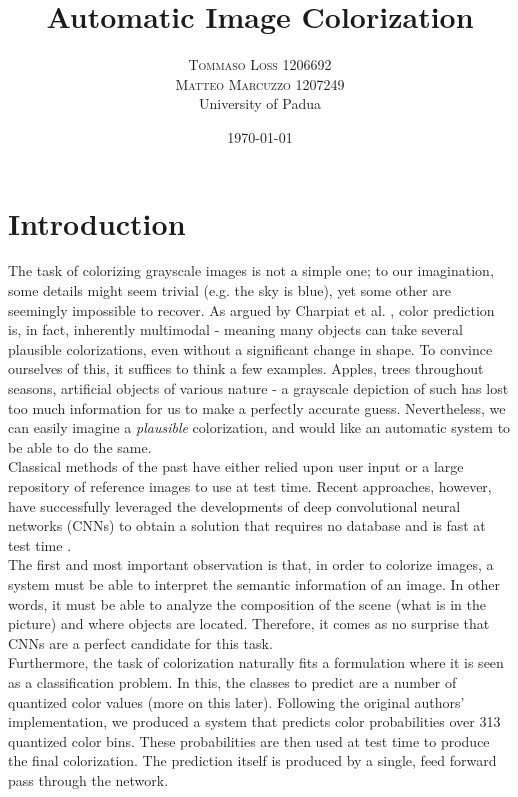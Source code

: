 \documentclass[twoside,twocolumn]{article}
\title{Automatic Image Colorization} %
\author{%
\textsc{Tommaso Loss 1206692} \\
\textsc{Matteo Marcuzzo 1207249}
 \\[1ex] %
\normalsize University of Padua \\ %
}
\date{\today} %
\begin{document}
\maketitle


\section{Introduction}

The task of colorizing grayscale images is not a simple one; to our imagination, some details might seem trivial (e.g. the sky is blue), yet some other are seemingly impossible to recover. As argued by Charpiat et al. \cite{Charpiat:2008}, color prediction is, in fact, inherently multimodal - meaning many objects can take several plausible colorizations, even without a significant change in shape. To convince ourselves of this, it suffices to think a few examples. Apples, trees throughout seasons, artificial objects of various nature - a grayscale depiction of such has lost too much information for us to make a perfectly accurate guess. Nevertheless, we can easily imagine a \textit{plausible} colorization, and would like an automatic system to be able to do the same. \\
Classical methods of the past have either relied upon user input or a large repository of reference images to use at test time. Recent approaches, however, have successfully leveraged the developments of deep convolutional neural networks (CNNs) to obtain a solution that requires no database and is fast at test time \cite{Larsson:2016}.\\
The first and most important observation is that, in order to colorize images, a system must be able to interpret the semantic information of an image. In other words, it must be able to analyze the composition of the scene (what is in the picture) and where objects are located. Therefore, it comes as no surprise that CNNs are a perfect candidate for this task.\\
Furthermore, the task of colorization naturally fits a formulation where it is seen as a classification problem. In this, the classes to predict are a number of quantized color values (more on this later). Following the original authors' \cite{Zhang:2016} implementation, we produced a system that predicts color probabilities over 313 quantized color bins. These probabilities are then used at test time to produce the final colorization. The prediction itself is produced by a single, feed forward pass through the network. \\
\end{document}
